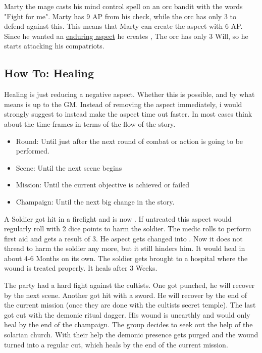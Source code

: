 \documentclass[11pt]{article}
\begin{document}
{\begin{pwexample}
Marty the mage casts his mind control spell on an orc bandit with the words "Fight for me". Marty has 9 AP from his check, while the orc has only 3 to defend against this. This means that Marty can create the aspect with 6 AP. Since he wanted an \hyperref[sec:orgd4ba133]{enduring aspect} he creates , The orc has only 3 Will, so he starts attacking his compatriots. 
\end{pwexample}
\subsection{How To: Healing}
\label{sec:org517e4a5}
Healing is just reducing a negative aspect. Whether this is possible, and by what means is up to the GM. Instead of removing the aspect immediately, i would strongly suggest to instead make the aspect time out faster. In most cases think about the time-frames in terms of the flow of the story.
\begin{itemize}
\item Round: Until just after the next round of combat or action is going to be performed.
\item Scene: Until the next scene begins
\item Mission: Until the current objective is achieved or failed
\item Champaign: Until the next big change in the story.
\end{itemize}

\begin{pwexample}
A Soldier got hit in a firefight and is now . If untreated this aspect would regularly roll with 2 dice points to harm the soldier. The medic rolls to perform first aid and gets a result of 3. He aspect gets changed into . Now it does not thread to harm the soldier any more, but it still hinders him. It would heal in about 4-6 Months on its own. The soldier gets brought to a hospital where the wound is treated properly. It heals after 3 Weeks. 
\end{pwexample}

\begin{pwexample}
The party had a hard fight against the cultists. One got punched, he will recover by the next scene. Another got hit with a sword. He will recover by the end of the current mission (once they are done with the cultists secret temple). The last got cut with the demonic ritual dagger. His wound is unearthly and would only heal by the end of the champaign. The group decides to seek out the help of the solarian church. With their help the demonic presence gets purged  and the wound turned into a regular cut, which heals by the end of the current mission.
\end{pwexample}
}
\end{document}
